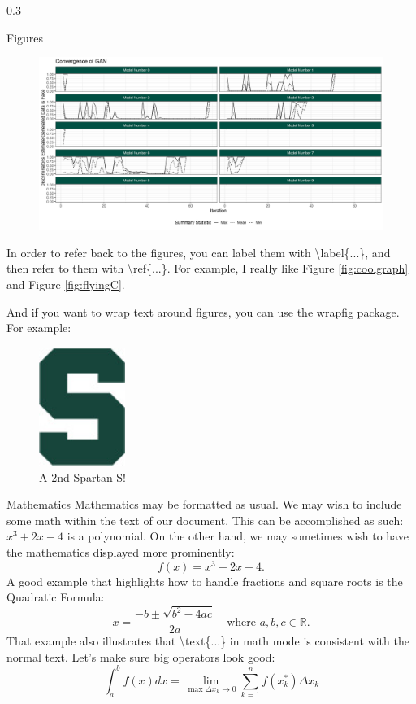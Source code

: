 \documentclass{msuposter}
\newcommand{\colwidth}{0.3\linewidth}
\begin{document}
\begin{frame}{}
\begin{columns}[t]
\begin{column}{\colwidth}
\begin{block}{Figures}
\begin{figure}\centering
\includegraphics[scale=1]{fig1.png}
\end{figure}
In order to refer back to the figures, you can label them with {\ttfamily\textbackslash label\{...\}}, and then refer to them with {\ttfamily\textbackslash ref\{...\}}.  For example, I really like Figure \ref{fig:coolgraph} and Figure \ref{fig:flyingC}.

And if you want to wrap text around figures, you can use the {\ttfamily wrapfig} package.  For example:

\begin{figure}
  \centering
    \includegraphics[width=0.25\textwidth]{spartans.jpg}
  \caption{A 2nd Spartan S!}
\end{figure}

\lipsum[1-2] %

\end{block}

\begin{block}{Mathematics}
Mathematics may be formatted as usual.  We may wish to include some math within the text of our document.  This can be accomplished as such: $x^{3} + 2x - 4$ is a polynomial.  On the other hand, we may sometimes wish to have the mathematics displayed more prominently:
\[
  f(x) = x^{3} + 2x - 4.
\]
A good example that highlights how to handle fractions and square roots is the Quadratic Formula:
\[
  x = \frac{-b \pm \sqrt{b^{2} - 4ac}}{2a} \quad\text{where } a,b,c \in \mathbb{R}.
\]
That example also illustrates that {\ttfamily \textbackslash text\{...\}} in math mode is consistent with the normal text.  Let's make sure big operators look good:
\[
  \int_{a}^{b} f(x) dx = \lim_{\max \Delta x_{k} \to 0} \sum_{k=1}^{n} f(x_{k}^{*}) \Delta x_{k}
\]
\end{block}


\end{column}
\end{columns}
\end{frame}
\end{document}

